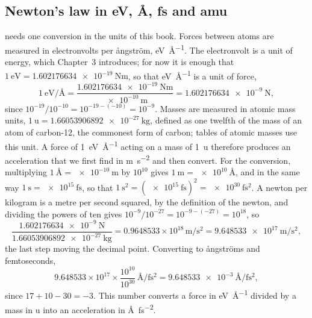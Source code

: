 \subsection*{Newton's law in eV, \AA, fs and amu}

 needs one conversion in the units of this book.
Forces between atoms are measured in electronvolts per \aa ngstr\"om,
\si{\electronvolt\per\angstrom}. The electronvolt is a unit of energy,
which Chapter~3 introduces; for now it is enough that $\SI{1}{\electronvolt}
= \SI{1.602176634e-19}{\newton\metre}$, so that
\si{\electronvolt\per\angstrom} is a unit of force,
\begin{equation*}
   \SI{1}{\electronvolt\per\angstrom}
   = \frac{\SI{1.602176634e-19}{\newton\metre}}{\SI{e-10}{\metre}}
   = \SI{1.602176634e-9}{\newton} ,
\end{equation*}
since $10^{-19}/10^{-10} = 10^{-19-(-10)} = 10^{-9}$.
Masses are measured in atomic mass units, $\SI{1}{\amu} =
\SI{1.66053906892e-27}{\kilogram}$, defined as one twelfth of the mass of
an atom of carbon-12, the commonest form of carbon; tables of atomic
masses use this unit. A force of \SI{1}{\electronvolt\per\angstrom}
acting on a mass of \SI{1}{\amu} therefore produces an acceleration that
we first find in \si{\metre\per\second\squared} and then convert. For the
conversion, multiplying $\SI{1}{\angstrom} = \SI{e-10}{\metre}$ by
$10^{10}$ gives $\SI{1}{\metre} = \SI{e10}{\angstrom}$, and in the same
way $\SI{1}{\second} = \SI{e15}{\femto\second}$, so that $\SI{1}{\second
\squared} = (\SI{e15}{\femto\second})^2 = \SI{e30}{\femto\second\squared}$.
A newton per kilogram is a metre per second squared, by the definition
of the newton, and dividing the powers of ten gives $10^{-9}/10^{-27} =
10^{-9-(-27)} = 10^{18}$, so
\begin{equation*}
   \frac{\SI{1.602176634e-9}{\newton}}{\SI{1.66053906892e-27}{\kilogram}}
   = 0.9648533\times10^{18}\,\si{\metre\per\second\squared}
   = \SI{9.648533e17}{\metre\per\second\squared} ,
\end{equation*}
the last step moving the decimal point. Converting to \aa ngstr\"oms and
femtoseconds,
\begin{equation*}
   9.648533\times10^{17}\times\frac{10^{10}}{10^{30}}\,
   \si{\angstrom\per\femto\second\squared}
   = \SI{9.648533e-3}{\angstrom\per\femto\second\squared} ,
\end{equation*}
since $17 + 10 - 30 = -3$.
This number converts a force in \si{\electronvolt\per\angstrom} divided by
a mass in \si{\amu} into an acceleration in
\si{\angstrom\per\femto\second\squared}.

